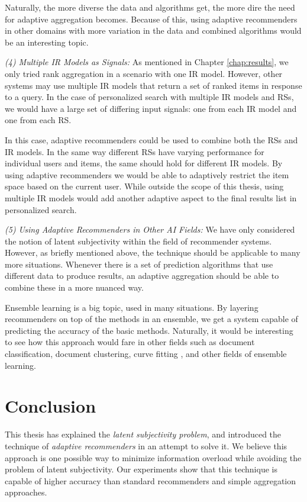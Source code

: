 Naturally, the more diverse the data and algorithms get,
the more dire the need for adaptive aggregation becomes.
Because of this, using adaptive recommenders in other domains with more variation 
in the data and combined algorithms would be an interesting topic.


\emph{(4) Multiple IR Models as Signals:}
As mentioned in Chapter \ref{chap:results},
we only tried rank aggregation in a scenario with one IR model.
However, other systems may use multiple IR models
that return a set of ranked items in response to a query.
In the case of personalized search with multiple IR models
and RSs, we would have a large set of differing
input signals:
one from each IR model and one from each RS.

In this case, adaptive recommenders could be used to combine
both the RSs and IR models.
In the same way different RSs have varying performance
for individual users and items, the same should hold
for different IR models.
By using adaptive recommenders we would be able
to adaptively restrict the item space based on the 
current user.
While outside the scope of this thesis,
using multiple IR models would add another adaptive
aspect to the final results list in personalized search.


\emph{(5) Using Adaptive Recommenders in Other AI Fields:}
We have only considered the notion of latent subjectivity within the field of recommender systems.
However, as briefly mentioned above, the technique should be applicable to many more situations.
Whenever there is a set of prediction algorithms that use different data to produce results,
an adaptive aggregation should be able to combine these in a more nuanced way.

Ensemble learning is a big topic, used in many situations.
By layering recommenders on top of the methods in an ensemble, 
we get a system capable of predicting the accuracy of the basic methods.
Naturally, it would be interesting to see how this approach would fare
in other fields such as document classification, document clustering,
curve fitting \cite[p.7]{Polikar2006}, and other fields of ensemble learning.


\section{Conclusion}

This thesis has explained the \emph{latent subjectivity problem},
and introduced the technique of \emph{adaptive recommenders}
in an attempt to solve it.
We believe this approach is one possible way to minimize information overload
while avoiding the problem of latent subjectivity.
Our experiments show that this technique is capable of higher accuracy
than standard recommenders and simple aggregation approaches.

